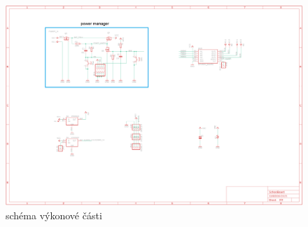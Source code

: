 \documentclass{template/socthesis}
\begin{document}
\begin{figure}[h]
	\centering
	\includegraphics[width=1.5\textwidth, angle = 90]{img/silovka.png}
	\caption{schéma výkonové části}
\end{figure}

\newpage
\printbibliography[title=Literatura]


\listoffigures
{}
\end{document}
